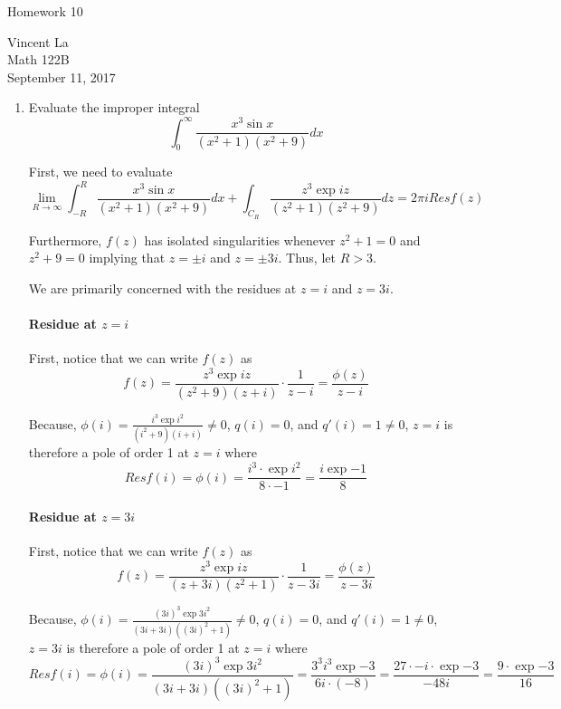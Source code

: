 \documentclass[11pt]{article}
\title{ }
\begin{document}
	\begin{center}	%
		\Large{Homework 10}	%
	\end{center}
	\begin{center}
		Vincent La \\
		Math 122B \\
		September 11, 2017
	\end{center}
	
\begin{enumerate}
	\item Evaluate the improper integral
	\[ \int^{\infty}_0 \frac{x^3 \sin{x}}{(x^2 + 1)(x^2 + 9)} dx \]
	
	First, we need to evaluate
	\[
	\lim_{R\rightarrow \infty} \int^R_{-R} \frac{x^3 \sin{x}}{(x^2 + 1)(x^2 + 9)} dx
	+ \int_{C_R} \frac{z^3 \exp{iz}}{(z^2 + 1)(z^2 + 9)} dz
	= 2\pi i Res f(z)
	\]
	
	Furthermore, $f(z)$ has isolated singularities whenever
	$z^2 + 1 = 0$ and $z^2 + 9 = 0$ implying that $z = \pm i$ and $z = \pm 3i$. Thus, let $R > 3$.
	
	We are primarily concerned with the residues at $z = i$ and $z = 3i$. 
	
	\paragraph{Residue at $z = i$} First, notice that we can write $f(z)$ as
	\[f(z) = \frac{z^3 \exp{iz}}{(z^2 + 9)(z + i)} \cdot \frac{1}{z - i}
	       = \frac{\phi{(z)}}{z - i}\]
	
	Because, $\phi(i) = \frac{i^3 \exp{i^2}}{(i^2 + 9)(i + i)} \neq 0$, $q(i) = 0$, and $q'(i) = 1 \neq 0$, $z = i$ is therefore a pole of order 1 at $z = i$ where
	\[Res f(i) = \phi(i) = \frac{i^3 \cdot \exp{i^2}}{8 \cdot -1}
	= \frac{i \exp{-1}}{8}
	\]
	
	\paragraph{Residue at $z = 3i$} First, notice that we can write $f(z)$ as
	\[f(z) = \frac{z^3 \exp{iz}}{(z + 3i)(z^2 + 1)} \cdot \frac{1}{z - 3i}
	= \frac{\phi{(z)}}{z - 3i}\]
	
	Because, $\phi(i) = \frac{(3i)^3 \exp{3i^2}}{ (3i + 3i) ((3i)^2 + 1)} \neq 0$, $q(i) = 0$, and $q'(i) = 1 \neq 0$, $z = 3i$ is therefore a pole of order 1 at $z = i$ where
	\[Res f(i) =
	 \phi(i) = \frac{(3i)^3 \exp{3i^2}}{ (3i + 3i) ((3i)^2 + 1)}
	 = \frac{3^3 i^3 \exp{-3}}{6i \cdot (-8)}
	 = \frac{27 \cdot -i \cdot \exp{-3}}{-48i}
	 = \frac{9 \cdot \exp{-3}}{16} \]
	

\end{enumerate}
\end{document}
